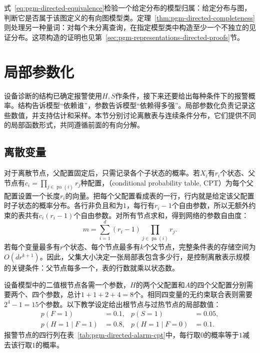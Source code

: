 式~\eqref{eq:pgm-directed-equivalence}检验一个给定分布的模型归属：给定分布与图，判断它是否属于该图定义的有向图模型类。定理~\ref{thm:pgm-directed-completeness}则处理另一种量词：对每个未分离查询，在指定模型类中构造至少一个不独立的见证分布。这项构造的证明也见第~\ref{sec:pgm-representations-directed-proofs}节。

\section{局部参数化}
\label{sec:pgm-directed-local-parameterization}

设备诊断的结构已确定报警使用$H,S$作条件，接下来还要给出每种条件下的报警概率。结构告诉模型“依赖谁”，参数告诉模型“依赖得多强”。局部参数化负责记录这些数值，并支持估计和采样。本节分别讨论离散表与连续条件分布，它们提供不同的局部函数形式，共同遵循前面的有向分解。

\subsection{离散变量}
\label{sec:pgm-directed-discrete}

对于离散节点，父配置固定后，只需记录各个子状态的概率。若$X_i$有$r_i$个状态、父节点有$c_i=\prod_{j\in\operatorname{pa}(i)}r_j$种配置，（conditional probability table, CPT）为每个父配置设置一个长度$r_i$的向量。把每个父配置看成表的一行，行内就是给定该父配置时子状态的概率分布。各行非负且和为$1$，每行有$r_i-1$个自由参数，所以无额外约束的表共有$c_i(r_i-1)$个自由参数。对所有节点求和，得到网络的参数自由度：
\begin{equation}
  m=\sum_{i=1}^{d}(r_i-1)
       \prod_{j\in\operatorname{pa}(i)}r_j.
  \label{eq:pgm-directed-cpt-size}
\end{equation}
若每个变量最多有$r$个状态、每个节点最多有$k$个父节点，完整条件表的存储空间为$O(dr^{k+1})$。因此，父集大小决定一张局部表包含多少行，是控制离散表示规模的关键条件：父节点每多一个，表的行数就乘以状态数。

设备模型中的二值根节点各需一个参数，$H$的两个父配置和$A$的四个父配置分别需要两个、四个参数，总计$1+1+2+4=8$个。相同四变量的无约束联合表则需要$2^4-1=15$个参数。以下教学设定给出根节点与过热节点的局部数值：
\[
  \begin{aligned}
    p(F=1)&=0.1,& p(S=1)&=0.05,\\
    p(H=1\mid F=1)&=0.8,&
    p(H=1\mid F=0)&=0.1.
  \end{aligned}
\]
报警节点的四行列在表~\ref{tab:pgm-directed-alarm-cpt}中，每行取$0$的概率等于$1$减去该行取$1$的概率。


